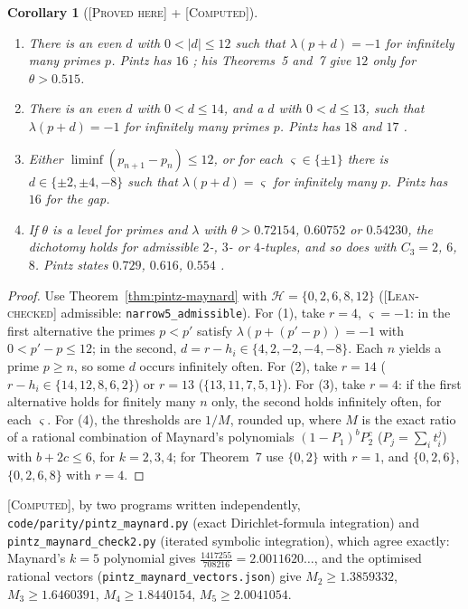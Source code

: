 \documentclass[11pt]{amsart}
\newtheorem{corollary}[theorem]{Corollary}
\theoremstyle{definition}
\theoremstyle{remark}
\newcommand{\lbl}[1]{\textup{\textsc{[#1]}}}
\begin{document}
\begin{corollary}[\lbl{Proved here} + \lbl{Computed}]\label{cor:pintz12}
\begin{enumerate}
\item There is an even $d$ with $0<|d|\le12$ such that $\lambda(p+d)=-1$ for
  infinitely many primes $p$. Pintz has $16$ \cite[Theorem~1]{Pi10}; his
  Theorems~5 and~7 give $12$ only for $\theta>0.515$.
\item There is an even $d$ with $0<d\le14$, and a $d$ with $0<d\le13$, such that
  $\lambda(p+d)=-1$ for infinitely many primes $p$. Pintz has $18$ and $17$
  \cite[Theorem~1'' and the remark after it]{Pi10}.
\item Either $\liminf(p_{n+1}-p_n)\le12$, or for each $\varsigma\in\{\pm1\}$ there is
  $d\in\{\pm2,\pm4,-8\}$ such that $\lambda(p+d)=\varsigma$ for infinitely many $p$.
  Pintz has $16$ for the gap.
\item If $\theta$ is a level for primes and $\lambda$ with $\theta>0.72154$,
  $0.60752$ or $0.54230$, the dichotomy holds for admissible $2$-, $3$- or
  $4$-tuples, and so does \cite[Theorem~7]{Pi10} with $C_3=2$, $6$, $8$. Pintz
  states $0.729$, $0.616$, $0.554$ \cite[Theorem~5]{Pi10}.
\end{enumerate}
\end{corollary}

\begin{proof}
\begin{sloppypar}
Use Theorem~\ref{thm:pintz-maynard} with $\mathcal H=\{0,2,6,8,12\}$
(\lbl{Lean-checked} admissible: \texttt{narrow5\_admissible}). For (1), take
$r=4$, $\varsigma=-1$: in the first alternative the primes $p<p'$ satisfy
$\lambda(p+(p'-p))=-1$ with $0<p'-p\le12$; in the second,
$d=r-h_i\in\{4,2,-2,-4,-8\}$. Each $n$ yields a prime $p\ge n$, so some $d$
occurs infinitely often. For (2), take $r=14$ ($r-h_i\in\{14,12,8,6,2\}$) or
$r=13$ ($\{13,11,7,5,1\}$). For (3), take $r=4$: if the first alternative holds
for finitely many $n$ only, the second holds infinitely often, for each
$\varsigma$. For (4), the thresholds are $1/M$, rounded up, where $M$ is the
exact ratio of a rational combination of Maynard's polynomials $(1-P_1)^bP_2^c$ ($P_j=\sum_it_i^j$) with
$b+2c\le6$, for $k=2,3,4$; for Theorem~7 use $\{0,2\}$ with $r=1$, and
$\{0,2,6\}$, $\{0,2,6,8\}$ with $r=4$.
\end{sloppypar}
\end{proof}

\begin{sloppypar}
\lbl{Computed}, by two programs written independently,
\texttt{code/}\allowbreak\texttt{parity/}\allowbreak\texttt{pintz\_maynard.py} (exact
Dirichlet-formula integration) and \texttt{pintz\_maynard\_check2.py} (iterated
symbolic integration), which agree exactly: Maynard's $k=5$ polynomial gives
$\frac{1417255}{708216}=2.0011620\ldots$, and the optimised rational vectors
(\texttt{pintz\_maynard\_vectors.json}) give $M_2\ge1.3859332$,
$M_3\ge1.6460391$, $M_4\ge1.8440154$, $M_5\ge2.0041054$.
\end{sloppypar}
\end{document}
